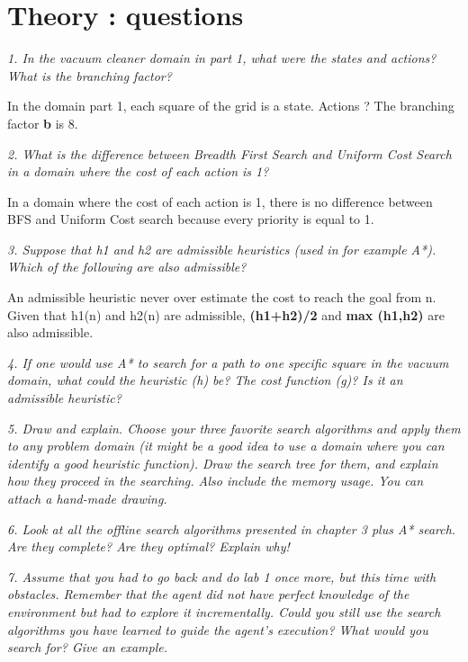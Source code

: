 \section{Theory : questions}

\textit{1. In the vacuum cleaner domain in part 1, what were the states and actions? What is the branching factor?}

In the domain part 1, each square of the grid is a state.
Actions ?
The branching factor \textbf{b} is 8.

\textit{2. What is the difference between Breadth First Search and Uniform Cost Search in a domain where the cost of each action is 1?}

In a domain where the cost of each action is 1, there is no difference between
BFS and Uniform Cost search because every priority is equal to 1.

\textit{3. Suppose that h1 and h2 are admissible heuristics (used in for example A*). Which of the following are also admissible?}

An admissible heuristic never over estimate the cost to reach the goal from n.
Given that h1(n) and h2(n) are admissible, \textbf{(h1+h2)/2} and \textbf{max (h1,h2)}
are also admissible.

\textit{4. If one would use A* to search for a path to one specific square in the vacuum domain, what could the heuristic (h) be? The cost function (g)? Is it an admissible heuristic?}



\textit{5. Draw and explain. Choose your three favorite search algorithms and apply them to any problem domain (it might be a good idea to use a domain where you can identify a good heuristic function). Draw the search tree for them, and explain how they proceed in the searching. Also include the memory usage. You can attach a hand-made drawing.}

\textit{6. Look at all the offline search algorithms presented in chapter 3 plus A* search. Are they complete? Are they optimal? Explain why!}

\textit{7. Assume that you had to go back and do lab 1 once more, but this time with obstacles. Remember that the agent did not have perfect knowledge of the environment but had to explore it incrementally. Could you still use the search algorithms you have learned to guide the agent's execution? What would you search for? Give an example.}
